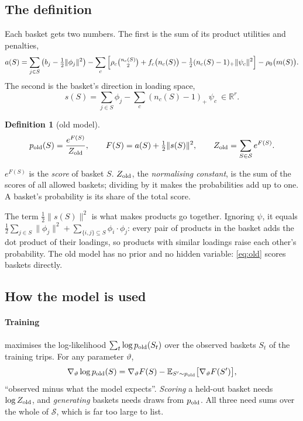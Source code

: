 \documentclass[11pt,a4paper]{article}
\newtheorem{definition}{Definition}
\newcommand{\E}{\mathbb E}
\newcommand{\R}{\mathbb R}
\newcommand{\pos}[1]{(#1)_+}
\begin{document}
\subsection{The definition}

Each basket gets two numbers. The first is the sum of its product utilities and penalties,
\[
a(S)=\sum_{j\in S}\big(b_j-\tfrac12\lVert\phi_j\rVert^2\big)
-\sum_c\Big[\rho_c\tbinom{n_c(S)}{2}+f_c\big(n_c(S)\big)-\tfrac12\pos{n_c(S)-1}\lVert\psi_c\rVert^2\Big]-\rho_0\big(m(S)\big).
\]
The second is the basket's direction in loading space,
\[
s(S)=\sum_{j\in S}\phi_j-\sum_c\pos{n_c(S)-1}\,\psi_c\ \in\R^r .
\]

\begin{definition}[old model]
\begin{equation}
p_{\rm old}(S)=\frac{e^{F(S)}}{Z_{\rm old}},\qquad F(S)=a(S)+\tfrac12\lVert s(S)\rVert^2,\qquad
Z_{\rm old}=\sum_{S\in\mathcal S}e^{F(S)} .
\label{eq:old}
\end{equation}
\end{definition}

$e^{F(S)}$ is the \emph{score} of basket $S$. $Z_{\rm old}$, the \emph{normalising constant}, is the sum of the
scores of all allowed baskets; dividing by it makes the probabilities add up to one. A basket's probability is
its share of the total score.

The term $\tfrac12\lVert s(S)\rVert^2$ is what makes products go together. Ignoring $\psi$, it equals
$\tfrac12\sum_{j\in S}\lVert\phi_j\rVert^2+\sum_{\{i,j\}\subseteq S}\phi_i\cdot\phi_j$: every pair of products in the
basket adds the dot product of their loadings, so products with similar loadings raise each other's
probability. The old model has no prior and no hidden variable: \eqref{eq:old} scores baskets directly.

\subsection{How the model is used}

\paragraph{Training} maximises the log-likelihood $\sum_t\log p_{\rm old}(S_t)$ over the observed baskets $S_t$ of
the training trips. For any parameter $\vartheta$,
\begin{equation}
\nabla_\vartheta\log p_{\rm old}(S)=\nabla_\vartheta F(S)-\E_{S'\sim p_{\rm old}}\big[\nabla_\vartheta F(S')\big],
\label{eq:grad}
\end{equation}
``observed minus what the model expects''. \emph{Scoring} a held-out basket needs $\log Z_{\rm old}$, and
\emph{generating} baskets needs draws from $p_{\rm old}$. All three need sums over the whole of $\mathcal S$, which is
far too large to list.
\end{document}
